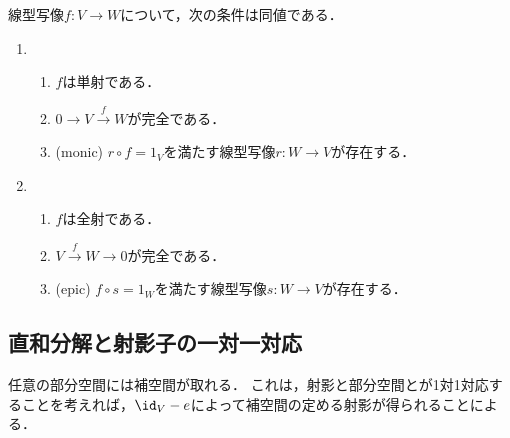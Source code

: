\documentclass[uplatex, dvipdfmx]{jsreport}
\begin{document}
\begin{corollary}[全射・単射の図式による特徴付け]
    線型写像$f:V\to W$について，次の条件は同値である．
    \begin{enumerate}
        \item \begin{enumerate}[(1)]
            \item $f$は単射である．
            \item $0\to V\xrightarrow{f}W$が完全である．
            \item (monic) $r\circ f=1_V$を満たす線型写像$r:W\to V$が存在する．
        \end{enumerate}
        \item \begin{enumerate}[(1)]
            \item $f$は全射である．
            \item $V\xrightarrow{f}W\to 0$が完全である．
            \item (epic) $f\circ s=1_W$を満たす線型写像$s:W\to V$が存在する．
        \end{enumerate}
    \end{enumerate}
\end{corollary}

\subsection{直和分解と射影子の一対一対応}

\begin{tcolorbox}[colframe=ForestGreen, colback=ForestGreen!10!white,breakable,colbacktitle=ForestGreen!40!white,coltitle=black,fonttitle=\bfseries\sffamily,
title=線型空間の直和分解は冪等子と一対一対応する]
    任意の部分空間には補空間が取れる．
    これは，射影と部分空間とが1対1対応することを考えれば，$\id_V-e$によって補空間の定める射影が得られることによる．
\end{tcolorbox}
\end{document}
